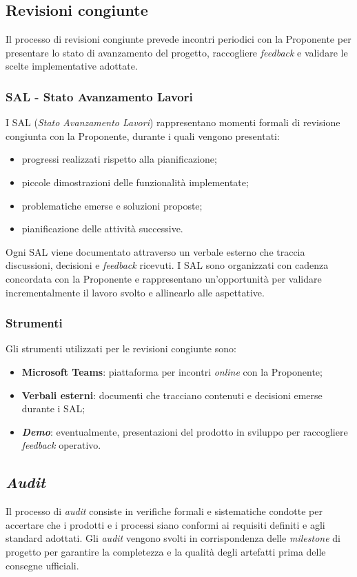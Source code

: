 \documentclass[10pt, letterpaper]{article}
\begin{document}
\subsection{Revisioni congiunte}
Il processo di revisioni congiunte prevede incontri periodici con la Proponente
per presentare lo stato di avanzamento del progetto, raccogliere \textit{feedback}
e validare le scelte implementative adottate.

\subsubsection{SAL - Stato Avanzamento Lavori}
I SAL (\textit{Stato Avanzamento Lavori}) rappresentano momenti formali di revisione
congiunta con la Proponente, durante i quali vengono presentati:
\begin{itemize}
    \item progressi realizzati rispetto alla pianificazione;
    \item piccole dimostrazioni delle funzionalità implementate;
    \item problematiche emerse e soluzioni proposte;
    \item pianificazione delle attività successive.
\end{itemize}
Ogni SAL viene documentato attraverso un verbale esterno che traccia discussioni,
decisioni e \textit{feedback} ricevuti. I SAL sono organizzati con cadenza concordata
con la Proponente e rappresentano un'opportunità per validare incrementalmente
il lavoro svolto e allinearlo alle aspettative.

\subsubsection{Strumenti}
Gli strumenti utilizzati per le revisioni congiunte sono:
\begin{itemize}
    \item \textbf{Microsoft Teams}: piattaforma per incontri \textit{online} con la Proponente;
    \item \textbf{Verbali esterni}: documenti che tracciano contenuti e decisioni emerse durante i SAL;
    \item \textbf{\textit{Demo}}: eventualmente, presentazioni del prodotto in sviluppo per raccogliere \textit{feedback} operativo.
\end{itemize}

\subsection{\textit{Audit}}
Il processo di \textit{audit} consiste in verifiche formali e sistematiche condotte per
accertare che i prodotti e i processi siano conformi ai requisiti definiti e agli
standard adottati. Gli \textit{audit} vengono svolti in corrispondenza delle \textit{milestone}
di progetto per garantire la completezza e la qualità degli artefatti prima
delle consegne ufficiali.
\end{document}
